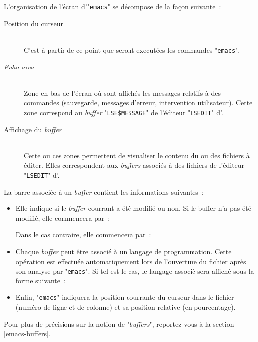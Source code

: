L'organisation de l'{\'e}cran d'"{\tt emacs}" se d{\'e}compose de la fa\c{c}on suivante~:
\begin{description}
	\item[{\rm Position du curseur}]\mbox{}\\
		C'est {\`a} partir de ce point que seront execut{\'e}es les commandes "{\tt emacs}".
	\item[{\sl Echo area}]\mbox{}\\
		Zone en bas de l'{\'e}cran o{\`u} sont affich{\'e}s les messages relatifs {\`a} des commandes
		(sauvegarde, messages d'erreur, intervention utilisateur). Cette zone
		correspond au {\sl buffer} "{\tt LSE\$MESSAGE}" de l'{\'e}diteur "{\tt LSEDIT}"
		d'{\OpenVMS}.
	\item[{\rm Affichage du {\sl buffer}}]\mbox{}\\
		Cette ou ces zones permettent de visualiser le contenu du ou des fichiers
		{\`a} {\'e}diter. Elles correspondent aux {\sl buffers} associ{\'e}s {\`a} des fichiers
		de l'{\'e}diteur "{\tt LSEDIT}" d'{\OpenVMS}.
\end{description}

La barre associ{\'e}e {\`a} un {\sl buffer} contient les informations suivantes~:
\begin{itemize}
	\item	Elle indique si le {\sl buffer} courrant a {\'e}t{\'e} modifi{\'e} ou non.
			Si le buffer n'a pas {\'e}t{\'e} modifi{\'e}, elle commencera par~:\\[2ex]
			\begin{center}
			\end{center}
			Dans le cas contraire, elle commencera par~:\\[2ex]
			\begin{center}
			\end{center}
	\item	Chaque {\sl buffer} peut {\^e}tre associ{\'e} {\`a} un langage de programmation.
			Cette op{\'e}ration est effectu{\'e}e automatiquement lors de
			l'ouverture du fichier apr{\`e}s son analyse par
			"{\tt emacs}". Si tel est le cas, le langage associ{\'e}
			sera affich{\'e} sous la forme suivante~:\\[2ex]
			\begin{center}
			\end{center}
	\item	Enfin, "{\tt emacs}" indiquera la position courrante
			du curseur dans le fichier (num{\'e}ro de ligne et
			de colonne) et sa position relative (en pourcentage).
\end{itemize}
Pour plus de pr{\'e}cisions sur la notion de "{\sl buffers}", reportez-vous
{\`a} la section \ref{emacs-buffers}.
			

